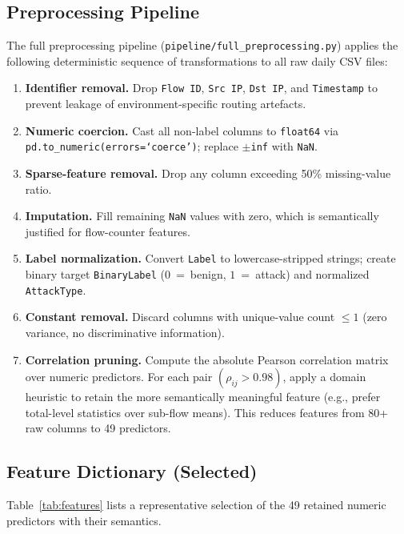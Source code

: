 \documentclass[10pt,conference]{IEEEtran}
\begin{document}
\subsection{Preprocessing Pipeline}
\label{sec:preproc}

The full preprocessing pipeline (\texttt{pipeline/full\_preprocessing.py})
applies the following deterministic sequence of transformations to all
raw daily CSV files:

\begin{enumerate}[leftmargin=*,noitemsep,topsep=0pt]
  \item \textbf{Identifier removal.} Drop \texttt{Flow~ID},
        \texttt{Src~IP}, \texttt{Dst~IP}, and \texttt{Timestamp} to
        prevent leakage of environment-specific routing artefacts.
  \item \textbf{Numeric coercion.} Cast all non-label columns to
        \texttt{float64} via \texttt{pd.to\_numeric(errors=`coerce')};
        replace \texttt{$\pm$inf} with \texttt{NaN}.
  \item \textbf{Sparse-feature removal.} Drop any column exceeding 50\%
        missing-value ratio.
  \item \textbf{Imputation.} Fill remaining \texttt{NaN} values with
        zero, which is semantically justified for flow-counter features.
  \item \textbf{Label normalization.} Convert \texttt{Label} to
        lowercase-stripped strings; create binary target
        \texttt{BinaryLabel} ($0$~=~benign, $1$~=~attack) and
        normalized \texttt{AttackType}.
  \item \textbf{Constant removal.} Discard columns with unique-value
        count $\leq 1$ (zero variance, no discriminative information).
  \item \textbf{Correlation pruning.} Compute the absolute Pearson
        correlation matrix over numeric predictors. For each pair
        $(\rho_{ij} > 0.98)$, apply a domain heuristic to retain the
        more semantically meaningful feature (e.g., prefer total-level
        statistics over sub-flow means). This reduces features from
        80+ raw columns to 49 predictors.
\end{enumerate}

\subsection{Feature Dictionary (Selected)}

Table~\ref{tab:features} lists a representative selection of the 49
retained numeric predictors with their semantics.
\end{document}
